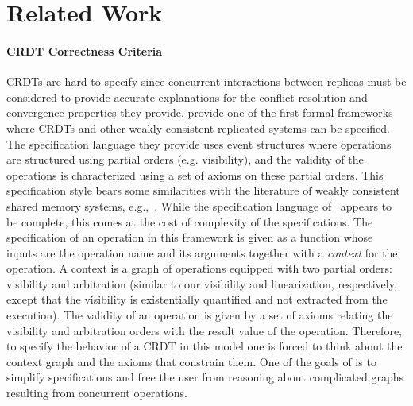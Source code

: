 \section{Related Work}
\label{sec:rel-work}

\paragraph{CRDT Correctness Criteria}
CRDTs are hard to specify since concurrent interactions between
replicas must be considered to provide accurate explanations for the
conflict resolution and convergence properties they provide.
%
\citet{BurckhardtGYZ14, Burckhardt14} provide one of the first formal
frameworks where CRDTs and other weakly consistent replicated systems
can be specified.
%
The specification language they provide uses event structures where
operations are structured using partial orders (e.g. visibility), and 
the validity of the operations is characterized using a set of 
axioms on these partial orders.
%
This specification style bears some similarities with the literature
of weakly consistent shared memory systems, e.g.,~\cite{AlglaveMT14}.
%
While the specification language
of~\cite{BurckhardtGYZ14,Burckhardt14} appears to be complete, this
comes at the cost of complexity of the specifications.
%
The specification of an operation in this framework is given as a
function whose inputs are the operation name and its arguments
together with a \emph{context} for the operation.
%
A context is a graph of operations equipped with two partial orders:
visibility and arbitration (similar to our visibility and linearization, respectively,
except that the visibility is existentially quantified and not extracted from the execution).
%
%
The validity of an operation is given by a set of axioms relating the
visibility and arbitration orders with the result value of the
operation.
%
Therefore, to specify the behavior of a CRDT in this model one is
forced to think about the context graph and the axioms that constrain
them.
%
One of the goals of \CRDTLinshort{} is to simplify specifications and
free the user from reasoning about complicated graphs resulting from
concurrent operations.

